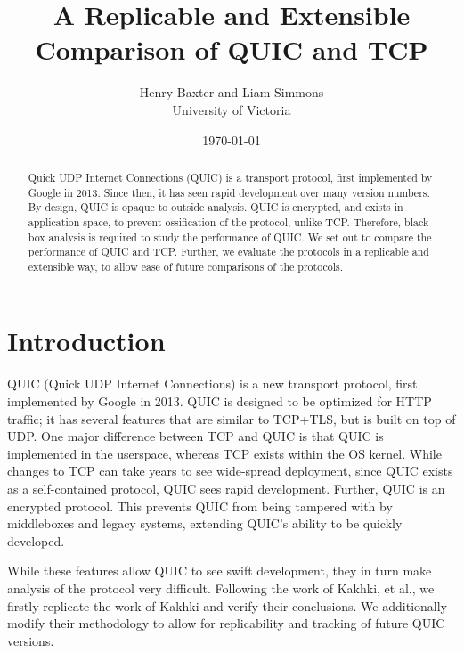 \documentclass[12pt]{article}
\begin{document}
\title{A Replicable and Extensible Comparison of QUIC and TCP}
\author{Henry Baxter and Liam Simmons\\
		University of Victoria}
\date{\today}

\maketitle

\begin{abstract}
	Quick UDP Internet Connections (QUIC) is a transport protocol, first implemented by Google in 2013. Since then, it has seen rapid development over many version numbers. By design, QUIC is opaque to outside analysis. QUIC is encrypted, and exists in application space, to prevent ossification of the protocol, unlike TCP. Therefore, black-box analysis is required to study the performance of QUIC. We set out to compare the performance of QUIC and TCP. Further, we evaluate the protocols in a replicable and extensible way, to allow ease of future comparisons of the protocols. 
\end{abstract}

\section{Introduction}
\label{introduction}

QUIC (Quick UDP Internet Connections) is a new transport protocol, first implemented by Google in 2013. QUIC is designed to be optimized for HTTP traffic; it has several features that are similar to TCP+TLS, but is built on top of UDP. One major difference between TCP and QUIC is that QUIC is implemented in the userspace\cite{quicLayout}, whereas TCP exists within the OS kernel. While changes to TCP can take years to see wide-spread deployment, since QUIC exists as a self-contained protocol, QUIC sees rapid development. Further, QUIC is an encrypted protocol. This prevents QUIC from being tampered with by middleboxes and legacy systems, extending QUIC's ability to be quickly developed. 

While these features allow QUIC to see swift development, they in turn make analysis of the protocol very difficult. Following the work of Kakhki, et al.\cite{Kakhki:2017:TLL:3131365.3131368}, we firstly replicate the work of Kakhki and verify their conclusions. We additionally modify their methodology to allow for replicability and tracking of future QUIC versions.
\end{document}
